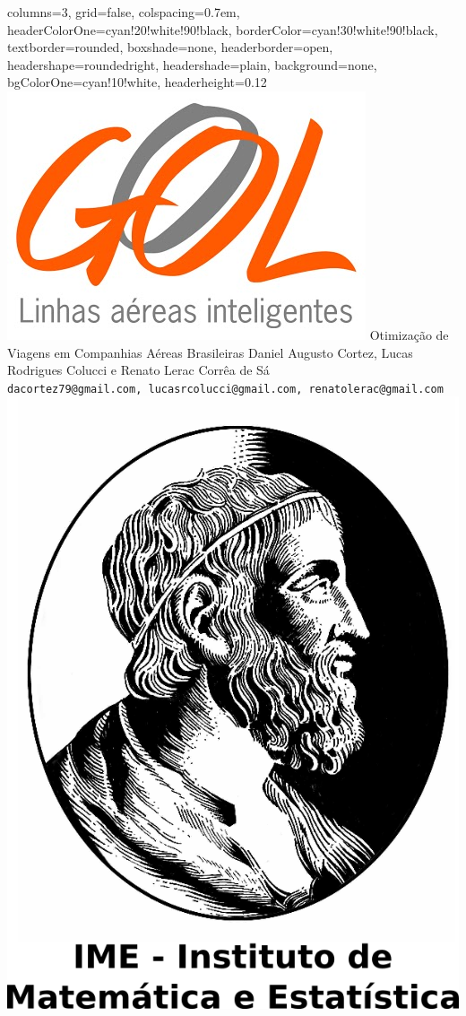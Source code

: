 \documentclass[portrait,b1paper,fontscale=0.400]{baposter}
\begin{document}
\begin{poster}{
columns=3,
grid=false,
colspacing=0.7em,
headerColorOne=cyan!20!white!90!black,
borderColor=cyan!30!white!90!black,
textborder=rounded,
boxshade=none,
headerborder=open,
headershape=roundedright,
headershade=plain,
background=none,
bgColorOne=cyan!10!white,
headerheight=0.12\textheight}
{
 \includegraphics[height=0.060\textheight]{gol}
}
{
\sc\Huge Otimização de Viagens em Companhias Aéreas Brasileiras
}
{
Daniel Augusto Cortez, Lucas Rodrigues Colucci e Renato Lerac Corrêa de Sá\\[1em]
{\texttt{dacortez79@gmail.com, lucasrcolucci@gmail.com, renatolerac@gmail.com}}
}
{
 \includegraphics[height=0.095\textheight]{logo}
}



\end{poster}
\end{document}

